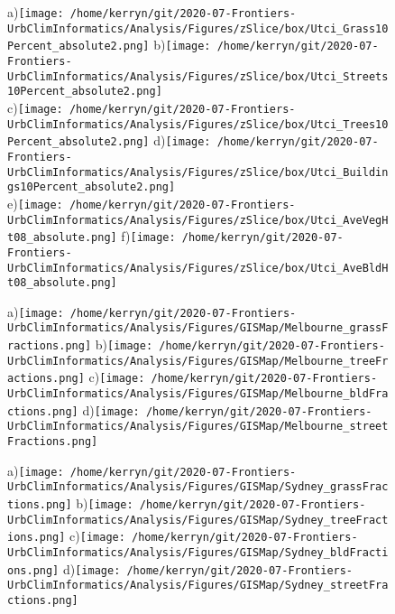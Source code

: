\documentclass{article}
\begin{document}
\begin{figure}
\centering    
a)\texttt{[image: /home/kerryn/git/2020-07-Frontiers-UrbClimInformatics/Analysis/Figures/zSlice/box/Utci\_Grass10Percent\_absolute2.png]}
b)\texttt{[image: /home/kerryn/git/2020-07-Frontiers-UrbClimInformatics/Analysis/Figures/zSlice/box/Utci\_Streets10Percent\_absolute2.png]}\\
c)\texttt{[image: /home/kerryn/git/2020-07-Frontiers-UrbClimInformatics/Analysis/Figures/zSlice/box/Utci\_Trees10Percent\_absolute2.png]}
d)\texttt{[image: /home/kerryn/git/2020-07-Frontiers-UrbClimInformatics/Analysis/Figures/zSlice/box/Utci\_Buildings10Percent\_absolute2.png]}\\
e)\texttt{[image: /home/kerryn/git/2020-07-Frontiers-UrbClimInformatics/Analysis/Figures/zSlice/box/Utci\_AveVegHt08\_absolute.png]}
f)\texttt{[image: /home/kerryn/git/2020-07-Frontiers-UrbClimInformatics/Analysis/Figures/zSlice/box/Utci\_AveBldHt08\_absolute.png]}
\end{figure} 
\clearpage




\begin{figure}
\centering    
a)\texttt{[image: /home/kerryn/git/2020-07-Frontiers-UrbClimInformatics/Analysis/Figures/GISMap/Melbourne\_grassFractions.png]}
b)\texttt{[image: /home/kerryn/git/2020-07-Frontiers-UrbClimInformatics/Analysis/Figures/GISMap/Melbourne\_treeFractions.png]}
c)\texttt{[image: /home/kerryn/git/2020-07-Frontiers-UrbClimInformatics/Analysis/Figures/GISMap/Melbourne\_bldFractions.png]}
d)\texttt{[image: /home/kerryn/git/2020-07-Frontiers-UrbClimInformatics/Analysis/Figures/GISMap/Melbourne\_streetFractions.png]}
\end{figure} 
\clearpage


\begin{figure}
\centering    
a)\texttt{[image: /home/kerryn/git/2020-07-Frontiers-UrbClimInformatics/Analysis/Figures/GISMap/Sydney\_grassFractions.png]}
b)\texttt{[image: /home/kerryn/git/2020-07-Frontiers-UrbClimInformatics/Analysis/Figures/GISMap/Sydney\_treeFractions.png]}
c)\texttt{[image: /home/kerryn/git/2020-07-Frontiers-UrbClimInformatics/Analysis/Figures/GISMap/Sydney\_bldFractions.png]}
d)\texttt{[image: /home/kerryn/git/2020-07-Frontiers-UrbClimInformatics/Analysis/Figures/GISMap/Sydney\_streetFractions.png]}
\end{figure} 
\clearpage
\end{document}
